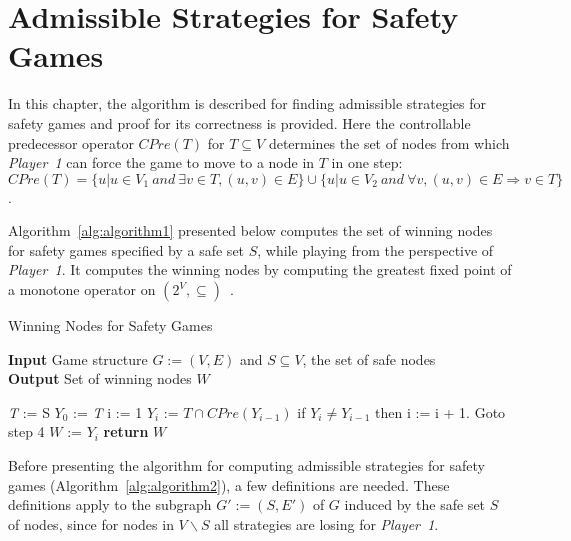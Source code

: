 \chapter{Admissible Strategies for Safety Games}
\label{Sec:Safety}
In this chapter, the algorithm is described for finding admissible
strategies for safety games and proof for its correctness is provided.  Here the
controllable predecessor operator $\mathit{CPre}(T)$ for $T \subseteq
V$ determines the set of nodes from which \textit{Player~1} can force
the game to move to a node in $T$ in one step:
$\mathit{CPre}(T) = \{u | u \in V_{1} \: and \: \exists v \in T, (u,v) \in E \}\cup \{u | u \in V_{2} \: and \: \forall v, (u,v) \in E \Rightarrow v \in T\}$.

Algorithm~\ref{alg:algorithm1} presented below computes the
set of winning nodes for safety games specified by a safe set $S$,
while playing from the perspective of \textit{Player~1}. It computes
the winning nodes by computing the greatest fixed point of a monotone
operator on $(2^{V}, \subseteq)$~\cite{SynthesisInfiniteGames}.

\begin{algorithm}
	\caption{Winning Nodes for Safety Games}
	\textbf{Input} Game structure $G := (V,E)$ and $S \subseteq V$, the set of safe nodes \\ 
	\textbf{Output} Set of winning nodes $W$
	\label{alg:algorithm1}
	\begin{algorithmic}[1]
		\STATE \textit{T} := S
		\STATE $Y_{0}$ := \textit{T}
		\STATE i := 1
		\STATE $Y_{i}$ := $\textit{T} \cap \mathit{CPre}(Y_{i-1})$
		\STATE if $Y_{i} \neq Y_{i-1}$ then i := i + 1. Goto step 4
		\STATE $W$ := $Y_{i}$
		\STATE \textbf{return} $W$
	\end{algorithmic}
\end{algorithm}



Before presenting the algorithm for computing admissible strategies
for safety games (Algorithm~\ref{alg:algorithm2}), a few
definitions are needed. These definitions apply to the subgraph $G' := (S,E')$ of
$G$ induced by the safe set $S$ of nodes, since for nodes in $V
\backslash S$ all strategies are losing for \textit{Player~1}.

